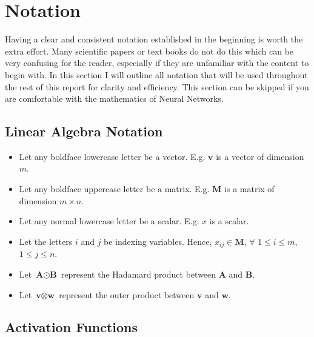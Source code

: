\documentclass[12pt]{report}
\begin{document}
\section{Notation}
\label{section: notation}
Having a clear and consistent notation established in the beginning is worth the extra effort. Many scientific papers or text books do not do this which can be very confusing for the reader, especially if they are unfamiliar with the content to begin with. In this section I will outline all notation that will be used throughout the rest of this report for clarity and efficiency. This section can be skipped if you are comfortable with the mathematics of Neural Networks.
\subsection{Linear Algebra Notation}
\begin{itemize}
    \item Let any boldface lowercase letter be a vector. E.g. $\textbf{v}$ is a vector of dimension $m$.
    \item Let any boldface uppercase letter be a matrix. E.g. $\textbf{M}$ is a matrix of dimension $m \times n$.
    \item Let any normal lowercase letter be a scalar. E.g. $x$ is a scalar.
    \item Let the letters $i$ and $j$ be indexing variables. Hence, $ x_{ij} \in \textbf{M}$, $\forall$ $1 \leq i \leq m$, $1 \leq j \leq n$.
    \item Let $\textbf{A} \odot \textbf{B}$ represent the Hadamard product between $\textbf{A}$ and $\textbf{B}$.
    \item Let $\textbf{v} \otimes \textbf{w}$ represent the outer product between $\textbf{v}$ and $\textbf{w}$.
\end{itemize}

\subsection{Activation Functions}
\end{document}
